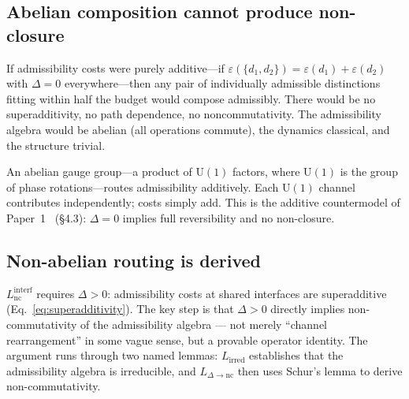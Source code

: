 \documentclass[11pt]{article}
\newcommand{\U}{\mathrm{U}}
\begin{document}
\subsection{Abelian composition cannot produce non-closure}

If admissibility costs were purely additive---if $\varepsilon(\{d_1, d_2\}) = \varepsilon(d_1) + \varepsilon(d_2)$ with $\Delta = 0$ everywhere---then any pair of individually admissible distinctions fitting within half the budget would compose admissibly.  There would be no superadditivity, no path dependence, no noncommutativity.  The admissibility algebra would be abelian (all operations commute), the dynamics classical, and the structure trivial.

An abelian gauge group---a product of $\U(1)$ factors, where $\U(1)$ is the group of phase rotations---routes admissibility additively.  Each $\U(1)$ channel contributes independently; costs simply add.  This is the additive countermodel of Paper~1~\cite{BrookePaper1} (\S4.3): $\Delta = 0$ implies full reversibility and no non-closure.

\subsection{Non-abelian routing is derived}

$L_{\mathrm{nc}}^{\mathrm{interf}}$ requires $\Delta > 0$: admissibility costs at shared interfaces are superadditive (Eq.~\ref{eq:superadditivity}).  The key step is that $\Delta > 0$ directly implies non-commutativity of the admissibility algebra --- not merely ``channel rearrangement'' in some vague sense, but a provable operator identity.  The argument runs through two named lemmas: $L_{\mathrm{irred}}$ establishes that the admissibility algebra is irreducible, and $L_{\Delta\to\mathrm{nc}}$ then uses Schur's lemma to derive non-commutativity.
\end{document}
